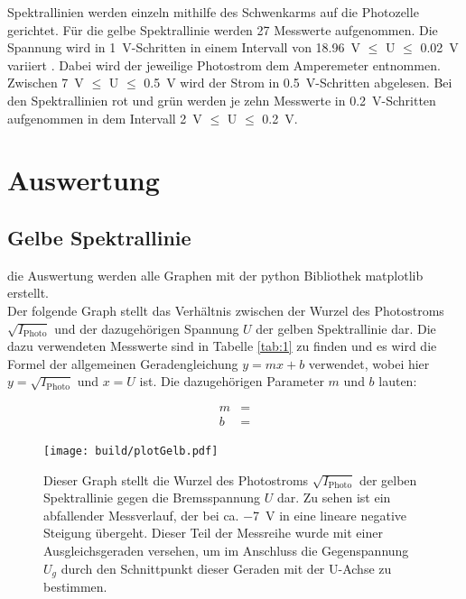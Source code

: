     \justifying Spektrallinien werden einzeln mithilfe des Schwenkarms auf die Photozelle gerichtet.
    Für die gelbe Spektrallinie werden 27 Messwerte aufgenommen. Die Spannung wird in \SI{1}{\volt}-Schritten in einem Intervall von 
    \SI{18.96}{\volt} $\leq$ U $\leq$ \SI{0.02}{\volt} variiert . Dabei wird der jeweilige Photostrom dem Amperemeter entnommen. Zwischen \SI{7}{\volt} $\leq$ U $\leq$ \SI{0.5}{\volt}
    wird der Strom in \SI{0.5}{\volt}-Schritten abgelesen.
    Bei den Spektrallinien rot und grün werden je zehn Messwerte in \SI{0.2}{\volt}-Schritten aufgenommen in dem Intervall \SI{2}{\volt} $\leq$ U $\leq$ \SI{0.2}{\volt}. 

\section{Auswertung}

\subsection{Gelbe Spektrallinie}

    \justifying die Auswertung werden alle Graphen mit der python Bibliothek matplotlib \cite{matplotlib} erstellt.\\
    Der folgende Graph stellt das Verhältnis zwischen der Wurzel des Photostroms $\sqrt{I_{\text{Photo}}}$ und der dazugehörigen Spannung $U$ der gelben Spektrallinie dar. Die dazu verwendeten Messwerte sind 
    in Tabelle \ref{tab:1} zu finden und es wird die Formel der allgemeinen Geradengleichung $y=mx+b$ verwendet, wobei hier $y=\sqrt{I_{\text{Photo}}}$ und $x=U$ ist. Die dazugehörigen 
    Parameter $m$ und $b$ lauten:

    \begin{align}
    m &= \text{} \label{eq:6}\\
    b &= \text{} \label{eq:7}
    \end{align}

    \begin{figure}[H]
        \centering
        \texttt{[image: build/plotGelb.pdf]}
        \caption{Dieser Graph stellt die Wurzel des Photostroms $\sqrt{I_{\text{Photo}}}$ der gelben Spektrallinie gegen die Bremsspannung $U$ dar. Zu sehen ist ein abfallender Messverlauf, der
        bei ca. \SI{-7}{\volt} in eine lineare negative Steigung übergeht. Dieser Teil der Messreihe wurde mit einer Ausgleichsgeraden versehen, um im Anschluss die Gegenspannung
        $U_g$ durch den Schnittpunkt dieser Geraden mit der U-Achse zu bestimmen.}
        \label{fig:7}
    \end{figure}

